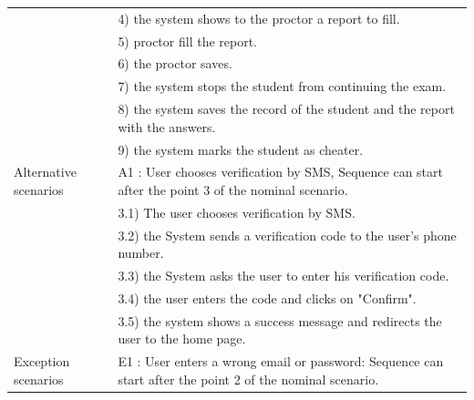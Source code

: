 \documentclass[]{uc2pfecaneva}
\begin{document}
\begin{table}[h]
\begin{tabularx}{\textwidth}{|l|X|}
		                      & 4) the system shows to the proctor a report to fill.                                                                   \\
		                      & 5) proctor fill the report.                                                                                            \\
		                      & 6) the proctor saves.                                                                                                  \\
		                      & 7) the system stops the student from continuing the exam.                                                              \\
		                      & 8) the system saves the record of the student and the report with the answers.                                         \\
		                      & 9) the system marks the student as cheater.                                                                            \\ \hline
		Alternative scenarios
		                      & A1 : User chooses verification by SMS,  Sequence can start after the point 3 of the nominal scenario.                  \\
		                      & \hspace{4mm}3.1) The user chooses verification by SMS.                                                                 \\
		                      & \hspace{4mm}3.2) the System sends a verification code to the user's phone number.                                      \\
		                      & \hspace{4mm}3.3) the System asks the user to enter his verification code.                                              \\
		                      & \hspace{4mm}3.4) the user enters the code and clicks on "Confirm".                                                     \\
		                      & \hspace{4mm}3.5) the system shows a success message and redirects the user to the home page.                           \\ \hline
		Exception scenarios
		                      & E1 : User enters a wrong email or password: Sequence can start after the point 2 of the nominal scenario.              \\

\end{tabularx}
\end{table}
\end{document}
